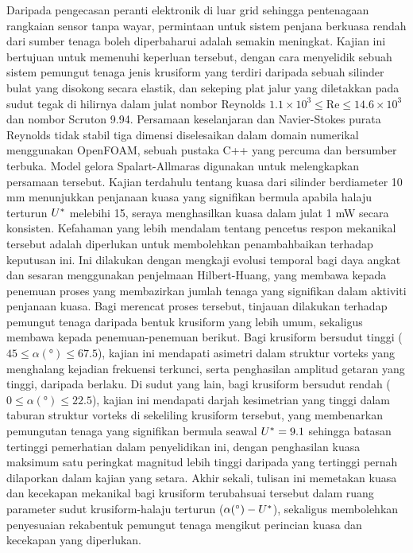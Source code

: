 \documentclass[oneside]{utmthesis}
\begin{document}
\begin{abstrak}
  Daripada pengecasan peranti elektronik di luar grid sehingga pentenagaan rangkaian sensor tanpa wayar, permintaan untuk sistem penjana berkuasa rendah dari sumber tenaga boleh diperbaharui adalah semakin meningkat. Kajian ini bertujuan untuk memenuhi keperluan tersebut, dengan cara menyelidik sebuah sistem pemungut tenaga jenis krusiform yang terdiri daripada sebuah silinder bulat yang disokong secara elastik, dan sekeping plat jalur yang diletakkan pada sudut tegak di hilirnya dalam julat nombor Reynolds $1.1 \times 10^{3} \leq \text{Re} \leq 14.6 \times 10^{3}$ dan nombor Scruton 9.94.
  Persamaan keselanjaran dan Navier-Stokes purata Reynolds tidak stabil tiga dimensi diselesaikan dalam domain numerikal menggunakan OpenFOAM, sebuah pustaka C++ yang percuma dan bersumber terbuka. Model gelora Spalart-Allmaras digunakan untuk melengkapkan persamaan tersebut. Kajian terdahulu tentang kuasa dari silinder berdiameter 10 mm menunjukkan penjanaan kuasa yang signifikan bermula apabila halaju terturun $U^{*}$ melebihi 15, seraya menghasilkan kuasa dalam julat 1 mW secara konsisten.
  Kefahaman yang lebih mendalam tentang pencetus respon mekanikal tersebut adalah diperlukan untuk membolehkan penambahbaikan terhadap keputusan ini. Ini dilakukan dengan mengkaji evolusi temporal bagi daya angkat dan sesaran menggunakan penjelmaan Hilbert-Huang, yang membawa kepada penemuan proses yang membazirkan jumlah tenaga yang signifikan dalam aktiviti penjanaan kuasa. Bagi merencat proses tersebut, tinjauan dilakukan terhadap pemungut tenaga daripada bentuk krusiform yang lebih umum, sekaligus membawa kepada penemuan-penemuan berikut.
  Bagi krusiform bersudut tinggi ($45 \le \alpha (\si{\degree}) \le 67.5$), kajian ini mendapati asimetri dalam struktur vorteks yang menghalang kejadian frekuensi terkunci, serta penghasilan amplitud getaran yang tinggi, daripada berlaku. Di sudut yang lain, bagi krusiform bersudut rendah ($0 \le \alpha (\si{\degree}) \le 22.5$), kajian ini mendapati darjah kesimetrian yang tinggi dalam taburan struktur vorteks di sekeliling krusiform tersebut, yang membenarkan pemungutan tenaga yang signifikan bermula seawal $U^{*} = 9.1$ sehingga batasan tertinggi pemerhatian dalam penyelidikan ini, dengan penghasilan kuasa maksimum satu peringkat magnitud lebih tinggi daripada yang tertinggi pernah dilaporkan dalam kajian yang setara.
  Akhir sekali, tulisan ini memetakan kuasa dan kecekapan mekanikal bagi krusiform terubahsuai tersebut dalam ruang parameter sudut krusiform-halaju terturun ($\alpha (\si{\degree})-\ured$), sekaligus membolehkan penyesuaian rekabentuk pemungut tenaga mengikut perincian kuasa dan kecekapan yang diperlukan.
\end{abstrak}
\end{document}
